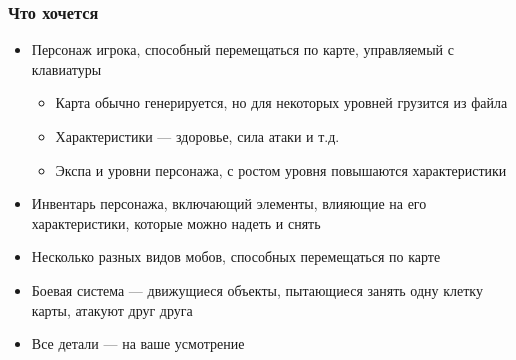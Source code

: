 \documentclass{../../slides-style}
\begin{document}
    \begin{frame}
        \frametitle{Что хочется}
        \begin{itemize}
            \item Персонаж игрока, способный перемещаться по карте, управляемый с клавиатуры
            \begin{itemize}
                \item Карта обычно генерируется, но для некоторых уровней грузится из файла
                \item Характеристики --- здоровье, сила атаки и т.д.
                \item Экспа и уровни персонажа, с ростом уровня повышаются характеристики
            \end{itemize}
            \item Инвентарь персонажа, включающий элементы, влияющие на его характеристики, которые можно надеть и снять
            \item Несколько разных видов мобов, способных перемещаться по карте
            \item Боевая система --- движущиеся объекты, пытающиеся занять одну клетку карты, атакуют друг друга
            \item Все детали --- на ваше усмотрение
        \end{itemize}
    \end{frame}
\end{document}
